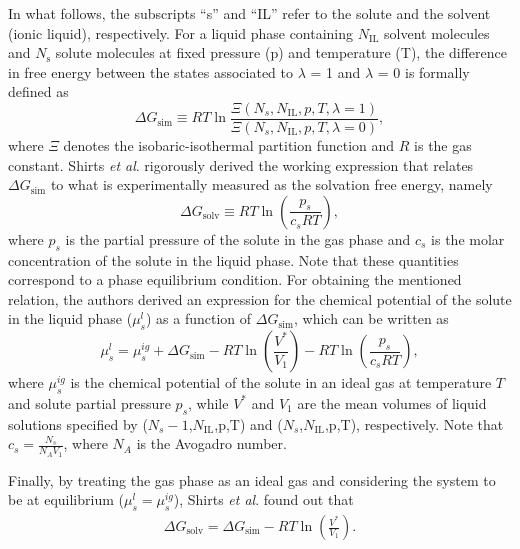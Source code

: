 \documentclass[3p,twocolumn]{elsarticle}
\begin{document}
In what follows, the subscripts ``s'' and ``IL'' refer to the solute and the solvent (ionic liquid), respectively.
For a liquid phase containing $N_\text{IL}$ solvent molecules and $N_{\text{s}}$ solute molecules at fixed pressure (p) and temperature (T), the difference in free energy between the states associated to $\lambda$ = 1 and $\lambda$ = 0 is formally defined as
\begin{equation}
\Delta G_\text{sim} \equiv R T \ln \frac{\Xi (N_s,N_\text{IL},p,T,\lambda = 1)}{\Xi (N_s,N_\text{IL},p,T,\lambda = 0)}, 
\end{equation}
where $\Xi$ denotes the isobaric-isothermal partition function and $R$ is the gas constant.
Shirts \textit{et al}. \cite{Shirts_2003} rigorously derived the working expression that relates $\Delta G_\text{sim}$ to what is experimentally measured as the solvation free energy, namely
\begin{equation}
\label{eq:solvation free energy definition}
\Delta G_{\text{solv}} \equiv R T \ln \left( \frac{p_s}{c_s R T} \right),
\end{equation}
where $p_s$ is the partial pressure of the solute in the gas phase and
$c_s$ is the molar concentration of the solute in the liquid phase.
Note that these quantities correspond to a phase equilibrium condition.
For obtaining the mentioned relation, the authors derived an expression for the chemical potential of the solute in the liquid phase ($\mu^l_s$) as a function of $\Delta G_\text{sim}$, which can be written as
\begin{equation}
\label{eq:solute chemical potential}
\mu^l_s = \mu^{ig}_s + \Delta G_\text{sim} - RT \ln \left( \frac{V^{\ast}}{V_1}\right) - RT \ln \left( \frac{p_s}{c_s R T} \right),
\end{equation}
where $\mu^{ig}_s$ is the chemical potential of the solute in an ideal gas at temperature $T$ and solute partial pressure $p_s$, while $V^{\ast}$ and $V_1$ are the mean volumes of liquid solutions specified by ($N_s-1$,$N_\text{IL}$,p,T) and ($N_s$,$N_\text{IL}$,p,T), respectively.
Note that $c_s = \frac{N_s}{N_A V_1}$, where $N_A$ is the Avogadro number.

Finally, by treating the gas phase as an ideal gas and considering the system to be at equilibrium ($\mu^l_s = \mu^{ig}_s$), Shirts \textit{et al}. \cite{Shirts_2003} found out that
\begin{equation}
\begin{split}
\label{eq:free_solv}
 \Delta G_{\text{solv}} = \Delta G_\text{sim} - RT \ln \left( \frac{V^{\ast}}{V_1}\right).
\end{split}
\end{equation}
\end{document}
